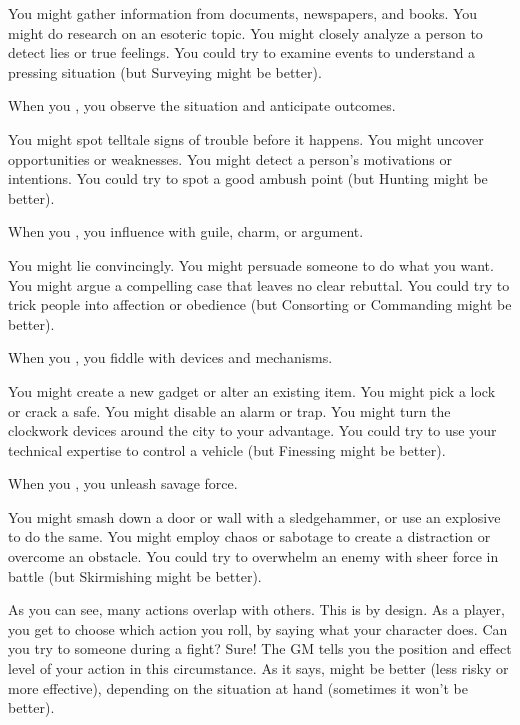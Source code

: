 \begin{qb}You might gather information from documents, newspapers, and books. You might do research on an esoteric topic. You might closely analyze a person to detect lies or true feelings. You could try to examine events to understand a pressing situation (but Surveying might be better).\end{qb}

When you , you observe the situation and anticipate outcomes.

\begin{qb}You might spot telltale signs of trouble before it happens. You might uncover opportunities or weaknesses. You might detect a person’s motivations or intentions. You could try to spot a good ambush point (but Hunting might be better).\end{qb}

When you , you influence with guile, charm, or argument.

\begin{qb}You might lie convincingly. You might persuade someone to do what you want. You might argue a compelling case that leaves no clear rebuttal. You could try to trick people into affection or obedience (but Consorting or Commanding might be better).\end{qb}

When you , you fiddle with devices and mechanisms.

\begin{qb}You might create a new gadget or alter an existing item. You might pick a lock or crack a safe. You might disable an alarm or trap. You might turn the clockwork devices around the city to your advantage. You could try to use your technical expertise to control a vehicle (but Finessing might be better).\end{qb}

When you , you unleash savage force.

\begin{qb}You might smash down a door or wall with a sledgehammer, or use an explosive to do the same. You might employ chaos or sabotage to create a distraction or overcome an obstacle. You could try to overwhelm an enemy with sheer force in battle (but Skirmishing might be better).\end{qb}

As you can see, many actions overlap with others. This is by design. As a player, you get to choose which action you roll, by saying what your character does. Can you try to  someone during a fight? Sure! The GM tells you the position and effect level of your action in this circumstance. As it says,  might be better (less risky or more effective), depending on the situation at hand (sometimes it won’t be better).

